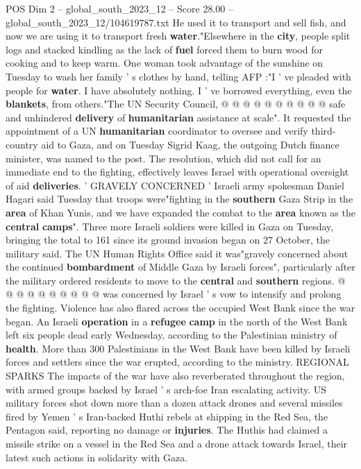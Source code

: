 \begin{textsample}{POS Dim 2 – global\_south\_2023\_12 – Score 28.00 – global\_south\_2023\_12/104619787.txt}
He used it to transport and sell fish, and now we are using it to transport fresh \textbf{water}."Elsewhere in the \textbf{city}, people split logs and stacked kindling as the lack of \textbf{fuel} forced them to burn wood for cooking and to keep warm.
One woman took advantage of the sunshine on Tuesday to wash her family ' s clothes by hand, telling AFP :"I ' ve pleaded with people for \textbf{water}.
I have absolutely nothing.
I ' ve borrowed everything, even the \textbf{blankets}, from others."The UN Security Council, @ @ @ @ @ @ @ @ @ @ safe and unhindered \textbf{delivery} of \textbf{humanitarian} assistance at scale".
It requested the appointment of a UN \textbf{humanitarian} coordinator to oversee and verify third-country aid to Gaza, and on Tuesday Sigrid Kaag, the outgoing Dutch finance minister, was named to the post.
The resolution, which did not call for an immediate end to the fighting, effectively leaves Israel with operational oversight of aid \textbf{deliveries}. ' GRAVELY CONCERNED ' Israeli army spokesman Daniel Hagari said Tuesday that troops were"fighting in the \textbf{southern} Gaza Strip in the \textbf{area} of Khan Yunis, and we have expanded the combat to the \textbf{area} known as the \textbf{central} \textbf{camps}".
Three more Israeli soldiers were killed in Gaza on Tuesday, bringing the total to 161 since its ground invasion began on 27 October, the military said.
The UN Human Rights Office said it was"gravely concerned about the continued \textbf{bombardment} of Middle Gaza by Israeli forces", particularly after the military ordered residents to move to the \textbf{central} and \textbf{southern} regions. @ @ @ @ @ @ @ @ @ @ was concerned by Israel ' s vow to intensify and prolong the fighting.
Violence has also flared across the occupied West Bank since the war began.
An Israeli \textbf{operation} in a \textbf{refugee} \textbf{camp} in the north of the West Bank left six people dead early Wednesday, according to the Palestinian ministry of \textbf{health}.
More than 300 Palestinians in the West Bank have been killed by Israeli forces and settlers since the war erupted, according to the ministry.
REGIONAL SPARKS The impacts of the war have also reverberated throughout the region, with armed groups backed by Israel ' s arch-foe Iran escalating activity.
US military forces shot down more than a dozen attack drones and several missiles fired by Yemen ' s Iran-backed Huthi rebels at shipping in the Red Sea, the Pentagon said, reporting no damage or \textbf{injuries}.
The Huthis had claimed a missile strike on a vessel in the Red Sea and a drone attack towards Israel, their latest such actions in solidarity with Gaza.

\end{textsample}
